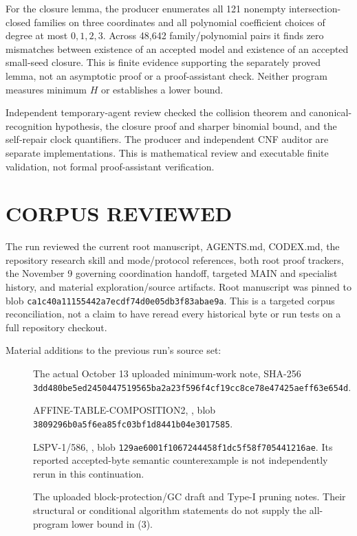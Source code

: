\documentclass[11pt]{article}
\begin{document}
For the closure lemma, the producer enumerates all 121 nonempty
intersection-closed families on three coordinates and all polynomial
coefficient choices of degree at most $0,1,2,3$.
Across 48,642 family/polynomial pairs it finds zero mismatches between
existence of an accepted model and existence of an accepted
small-seed closure. This is finite evidence supporting the separately
proved lemma, not an asymptotic proof or a proof-assistant check.
Neither program measures minimum $H$ or establishes a lower bound.

Independent temporary-agent review checked the collision theorem and
canonical-recognition hypothesis, the closure proof and sharper binomial
bound, and the self-repair clock quantifiers. The producer and independent
CNF auditor are separate implementations. This is mathematical review
and executable finite validation, not formal proof-assistant verification.

\section*{CORPUS REVIEWED}
The run reviewed the current root manuscript, AGENTS.md, CODEX.md,
the repository research skill and mode/protocol references, both
root proof trackers, the November 9 governing coordination handoff,
targeted MAIN and specialist history, and material exploration/source
artifacts. Root manuscript was pinned to blob
\texttt{ca1c40a11155442a7ecdf74d0e05db3f83abae9a}.
This is a targeted corpus reconciliation, not a claim to have reread
every historical byte or run tests on a full repository checkout.

Material additions to the previous run's source set:
\begin{description}
\item[] The actual October 13 uploaded minimum-work note,
SHA-256
\texttt{3dd480be5ed2450447519565ba2a23f596f4cf19cc8ce78e47425aeff63e654d}.
\item[] AFFINE-TABLE-COMPOSITION2,
,
blob \texttt{3809296b0a5f6ea85fc03bf1d8441b04e3017585}.
\item[] LSPV-1/586,
,
blob \texttt{129ae6001f1067244458f1dc5f58f705441216ae}.
Its reported accepted-byte semantic counterexample is not independently
rerun in this continuation.
\item[] The uploaded block-protection/GC draft and Type-I pruning notes.
Their structural or conditional algorithm statements do not supply
the all-program lower bound in (3).
\end{description}
\end{document}
